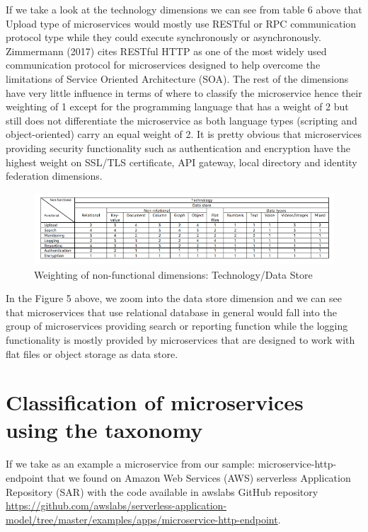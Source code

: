 \documentclass{article}
\begin{document}
If we take a look at the technology dimensions we can see from table 6 above that Upload type of microservices would mostly use RESTful or RPC communication protocol type while they could execute synchronously or asynchronously. Zimmermann (2017) cites RESTful HTTP as one of the most widely used communication protocol for microservices designed to help overcome the limitations of Service Oriented Architecture (SOA). The rest of the dimensions have very little influence in terms of where to classify the microservice hence their weighting of 1 except for the programming language that has a weight of 2 but still does not differentiate the microservice as both language types (scripting and object-oriented) carry an equal weight of 2. It is pretty obvious that microservices providing security functionality such as authentication and encryption have the highest weight on SSL/TLS certificate, API gateway, local directory and identity federation dimensions.

\begin{figure}[h!]
\includegraphics{table7.png}
\caption{Weighting of non-functional dimensions: Technology/Data Store}
\end{figure}

In the Figure 5 above, we zoom into the data store dimension and we can see that microservices that use relational database in general would fall into the group of microservices providing search or reporting function while the logging functionality is mostly provided by microservices that are designed to work with flat files or object storage as data store. 


\section{Classification of microservices using the taxonomy}


If we take as an example a microservice from our sample: microservice-http-endpoint that we found on Amazon Web Services (AWS) serverless Application Repository (SAR) with the code available in awslabs GitHub repository \url{https://github.com/awslabs/serverless-application-model/tree/master/examples/apps/microservice-http-endpoint}.
\end{document}
